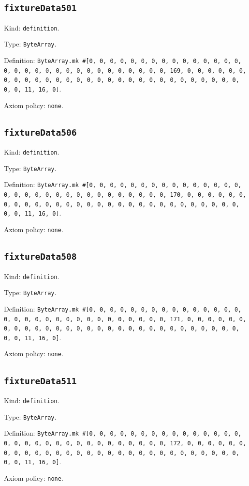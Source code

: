 \documentclass[11pt]{article}
\begin{document}
\subsection*{\texttt{fixtureData501}}
\noindent Kind: \texttt{definition}.\par
\noindent Type: \texttt{ByteArray}.\par
\noindent Definition: \texttt{ByteArray.mk \#[0, 0, 0, 0, 0, 0, 0, 0, 0, 0, 0, 0, 0, 0, 0, 0, 0, 0, 0, 0, 0, 0, 0, 0, 0, 0, 0, 0, 0, 0, 0, 169, 0, 0, 0, 0, 0, 0, 0, 0, 0, 0, 0, 0, 0, 0, 0, 0, 0, 0, 0, 0, 0, 0, 0, 0, 0, 0, 0, 0, 0, 0, 0, 11, 16, 0]}.\par
\noindent Axiom policy: \texttt{none}.\par
\subsection*{\texttt{fixtureData506}}
\noindent Kind: \texttt{definition}.\par
\noindent Type: \texttt{ByteArray}.\par
\noindent Definition: \texttt{ByteArray.mk \#[0, 0, 0, 0, 0, 0, 0, 0, 0, 0, 0, 0, 0, 0, 0, 0, 0, 0, 0, 0, 0, 0, 0, 0, 0, 0, 0, 0, 0, 0, 0, 170, 0, 0, 0, 0, 0, 0, 0, 0, 0, 0, 0, 0, 0, 0, 0, 0, 0, 0, 0, 0, 0, 0, 0, 0, 0, 0, 0, 0, 0, 0, 0, 11, 16, 0]}.\par
\noindent Axiom policy: \texttt{none}.\par
\subsection*{\texttt{fixtureData508}}
\noindent Kind: \texttt{definition}.\par
\noindent Type: \texttt{ByteArray}.\par
\noindent Definition: \texttt{ByteArray.mk \#[0, 0, 0, 0, 0, 0, 0, 0, 0, 0, 0, 0, 0, 0, 0, 0, 0, 0, 0, 0, 0, 0, 0, 0, 0, 0, 0, 0, 0, 0, 0, 171, 0, 0, 0, 0, 0, 0, 0, 0, 0, 0, 0, 0, 0, 0, 0, 0, 0, 0, 0, 0, 0, 0, 0, 0, 0, 0, 0, 0, 0, 0, 0, 11, 16, 0]}.\par
\noindent Axiom policy: \texttt{none}.\par
\subsection*{\texttt{fixtureData511}}
\noindent Kind: \texttt{definition}.\par
\noindent Type: \texttt{ByteArray}.\par
\noindent Definition: \texttt{ByteArray.mk \#[0, 0, 0, 0, 0, 0, 0, 0, 0, 0, 0, 0, 0, 0, 0, 0, 0, 0, 0, 0, 0, 0, 0, 0, 0, 0, 0, 0, 0, 0, 0, 172, 0, 0, 0, 0, 0, 0, 0, 0, 0, 0, 0, 0, 0, 0, 0, 0, 0, 0, 0, 0, 0, 0, 0, 0, 0, 0, 0, 0, 0, 0, 0, 11, 16, 0]}.\par
\noindent Axiom policy: \texttt{none}.\par
\end{document}
